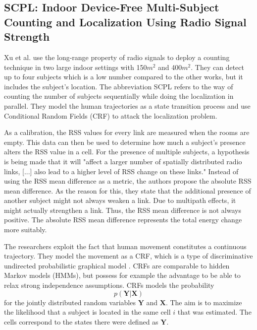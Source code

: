 \documentclass[conference]{IEEEtran}
\begin{document}
\subsection{SCPL: Indoor Device-Free Multi-Subject Counting and Localization Using Radio Signal Strength}
Xu et al. \cite{Xu} use the long-range property of radio signals to deploy a counting technique in two large indoor settings with 150$m^2$ and 400$m^2$. They can detect up to four subjects which is a low number compared to the other works, but it includes the subject's location. The abbreviation SCPL refers to the way of counting the number of subjects sequentially while doing the localization in parallel. They model the human trajectories as a state transition process and use Conditional Random Fields (CRF) to attack the localization problem.
\par
As a calibration, the RSS values for every link are measured when the rooms are empty. This data can then be used to determine how much a subject's presence alters the RSS value in a cell. For the presence of multiple subjects, a hypothesis is being made that it will "affect a larger number of spatially distributed radio links, [...] also lead to a higher level of RSS change on these links." Instead of using the RSS mean difference as a metric, the authors propose the absolute RSS mean difference. As the reason for this, they state that the additional presence of another subject might not always weaken a link. Due to multipath effects, it might actually strengthen a link. Thus, the RSS mean difference is not always positive. The absolute RSS mean difference represents the total energy change more suitably.
\par
The researchers exploit the fact that human movement constitutes a continuous trajectory. They model the movement as a CRF, which is a type of discriminative undirected probabilistic graphical model \cite{crf}. CRFs are comparable to hidden Markov models (HMMs), but possess for example the advantage to be able to relax strong independence assumptions. CRFs models the probability $$p(\bm{Y}|\bm{X})$$ for the jointly distributed random variables $\bm{Y}$ and $\bm{X}$. The aim is to maximize the likelihood that a subject is located in the same cell $i$ that was estimated. The cells correspond to the states there were defined as $\bm{Y}$.
\end{document}
